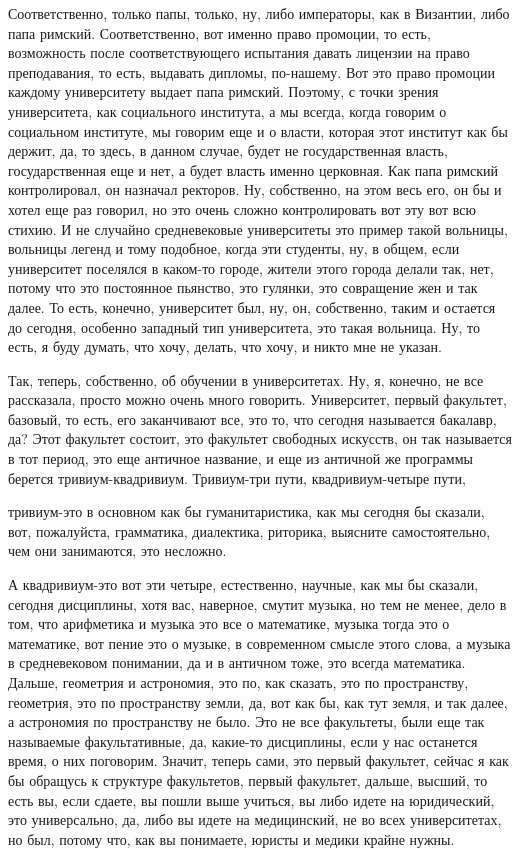 Соответственно, только папы, только, ну, либо императоры, как в Византии, либо
папа римский. Соответственно, вот именно право промоции, то есть, возможность
после соответствующего испытания давать лицензии на право преподавания, то есть,
выдавать дипломы, по-нашему. Вот это право промоции каждому университету выдает
папа римский. Поэтому, с точки зрения университета, как социального института, а
мы всегда, когда говорим о социальном институте, мы говорим еще и о власти,
которая этот институт как бы держит, да, то здесь, в данном случае, будет не
государственная власть, государственная еще и нет, а будет власть именно
церковная. Как папа римский контролировал, он назначал ректоров. Ну, собственно,
на этом весь его, он бы и хотел еще раз говорил, но это очень сложно
контролировать вот эту вот всю стихию. И не случайно средневековые университеты
это пример такой вольницы, вольницы  легенд и тому
подобное, когда эти студенты, ну, в общем, если университет поселялся в каком-то
городе, жители этого города делали так, нет, потому что это постоянное пьянство,
это гулянки, это совращение жен и так далее. То есть, конечно, университет был,
ну, он, собственно, таким и остается до сегодня, особенно западный тип
университета, это такая вольница. Ну, то есть, я буду думать, что хочу, делать,
что хочу, и никто мне не указан.

Так, теперь, собственно, об
обучении в университетах. Ну, я, конечно, не все рассказала, просто можно очень
много говорить. Университет, первый факультет, базовый, то есть, его заканчивают
все, это то, что сегодня называется бакалавр, да? Этот факультет состоит, это
факультет свободных искусств, он так называется в тот период, это еще античное
название, и еще из античной же программы берется тривиум-квадривиум. Тривиум-три
пути, квадривиум-четыре пути, 

тривиум-это в основном как бы гуманитаристика, как
мы сегодня бы сказали, вот, пожалуйста, грамматика, диалектика, риторика,
выясните самостоятельно, чем они занимаются, это несложно. 

А квадривиум-это вот
эти четыре, естественно, научные, как мы бы сказали, сегодня дисциплины, хотя
вас, наверное, смутит музыка, но тем не менее, дело в том, что арифметика и
музыка это все о математике, музыка тогда это о математике, вот пение это о
музыке, в современном смысле этого слова, а музыка в средневековом понимании, да
и в античном тоже, это всегда математика. Дальше, геометрия и астрономия, это
по, как сказать, это по пространству, геометрия, это по пространству земли, да,
вот как бы, как тут земля, и так далее, а астрономия по пространству не было.
Это не все факультеты, были еще так называемые факультативные, да, какие-то
дисциплины, если у нас останется время, о них поговорим. Значит, теперь сами,
это первый факультет, сейчас я как бы обращусь к структуре факультетов, первый
факультет, дальше, высший, то есть вы, если сдаете, вы пошли выше учиться, вы
либо идете на юридический, это универсально, да, либо вы идете на медицинский,
не во всех университетах, но был, потому что, как вы понимаете, юристы и медики
крайне нужны. 

